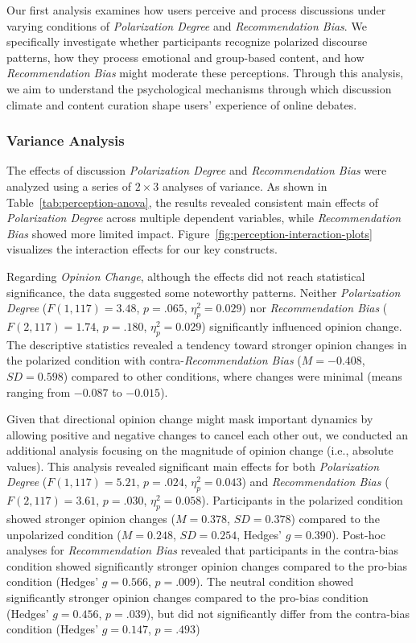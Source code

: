 Our first analysis examines how users perceive and process discussions under varying conditions of \emph{Polarization Degree} and \emph{Recommendation Bias}. We specifically investigate whether participants recognize polarized discourse patterns, how they process emotional and group-based content, and how \emph{Recommendation Bias} might moderate these perceptions. Through this analysis, we aim to understand the psychological mechanisms through which discussion climate and content curation shape users' experience of online debates.

\subsubsection{Variance Analysis}




The effects of discussion \emph{Polarization Degree} and \emph{Recommendation Bias} were analyzed using a series of $2 \times 3$ analyses of variance. As shown in Table~\ref{tab:perception-anova}, the results revealed consistent main effects of \emph{Polarization Degree} across multiple dependent variables, while \emph{Recommendation Bias} showed more limited impact. Figure~\ref{fig:perception-interaction-plots} visualizes the interaction effects for our key constructs.


Regarding \emph{Opinion Change}, although the effects did not reach statistical significance, the data suggested some noteworthy patterns. Neither \emph{Polarization Degree} ($F(1, 117) = 3.48$, $p = .065$, $\eta_p^2 = 0.029$) nor \emph{Recommendation Bias} ($F(2, 117) = 1.74$, $p = .180$, $\eta_p^2 = 0.029$) significantly influenced opinion change. The descriptive statistics revealed a tendency toward stronger opinion changes in the polarized condition with contra-\emph{Recommendation Bias} ($M = -0.408$, $SD = 0.598$) compared to other conditions, where changes were minimal (means ranging from $-0.087$ to $-0.015$).

Given that directional opinion change might mask important dynamics by allowing positive and negative changes to cancel each other out, we conducted an additional analysis focusing on the magnitude of opinion change (i.e., absolute values). This analysis revealed significant main effects for both \emph{Polarization Degree} ($F(1, 117) = 5.21$, $p = .024$, $\eta_p^2 = 0.043$) and \emph{Recommendation Bias} ($F(2, 117) = 3.61$, $p = .030$, $\eta_p^2 = 0.058$). Participants in the polarized condition showed stronger opinion changes ($M = 0.378$, $SD = 0.378$) compared to the unpolarized condition ($M = 0.248$, $SD = 0.254$, Hedges' $g = 0.390$). Post-hoc analyses for \emph{Recommendation Bias} revealed that participants in the contra-bias condition showed significantly stronger opinion changes compared to the pro-bias condition (Hedges' $g = 0.566$, $p = .009$). The neutral condition showed significantly stronger opinion changes compared to the pro-bias condition (Hedges' $g = 0.456$, $p = .039$), but did not significantly differ from the contra-bias condition (Hedges' $g = 0.147$, $p = .493$)

